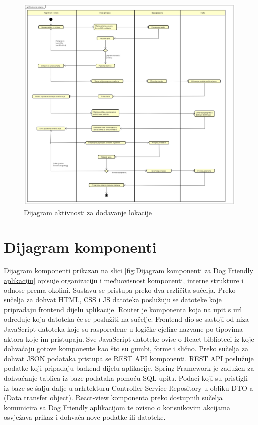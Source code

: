             \begin{figure}[H]
			    \includegraphics[width=\textwidth]{slike/Dijagram aktivnosti - Dodavanje lokacije.png} 
			        \caption{Dijagram aktivnosti za dodavanje lokacije}
			    \label{fig:Dijagram aktivnosti za dodavanje lokacije}
		    \end{figure}
      
		\newpage
		\section{Dijagram komponenti}
		  Dijagram komponenti prikazan na slici \ref{fig:Dijagram komponenti za Dog Friendly aplikaciju} opisuje organizaciju i međuovisnost komponenti, interne strukture i odnose prema okolini. Sustavu se pristupa preko dva različita sučelja. Preko sučelja za dohvat HTML, CSS i JS datoteka poslužuju se datoteke koje pripradaju frontend dijelu aplikacije. Router je komponenta koja na upit s url određuje koja datoteka će se poslužiti na sučelje. Frontend dio se sastoji od niza JavaScript datoteka koje su raspoređene u logičke cjeline nazvane po tipovima aktora koje im pristupaju. Sve JavaScript datoteke ovise o React biblioteci iz koje dohvaćaju gotove komponente kao što su gumbi, forme i slično. Preko sučelja za dohvat JSON podataka pristupa se REST API komponenti. REST API poslužuje podatke koji pripadaju backend dijelu aplikacije. Spring Framework je zadužen za dohvaćanje tablica iz baze podataka pomoću SQL upita. Podaci koji su pristigli iz baze se šalju dalje u arhitekturu Controller-Service-Repository u obliku DTO-a (Data transfer object). React-view komponenta preko dostupnih sučelja komunicira sa Dog Friendly aplikacijom te ovisno o korisnikovim akcijama osvježava prikaz i dohvaća nove podatke ili datoteke.
            
